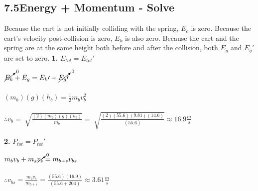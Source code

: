 \subsection*{7.5\hspace*{0.5cm}Energy + Momentum - Solve}
Because the cart is not initially colliding with the spring, $E_{e}$ is zero. Because the cart's velocity post-collision is zero, $E_{k}$ is also zero. Because the cart and the spring are at the same height both before and after the collision, both $E_{g}$ and $E_{g}\prime$ are set to zero.\newline\newline
\textbf{1.} $E_{tot} = E_{tot}\prime$ \\
\begin{adjustwidth}{0.6cm}{0pt}
    $\cancelto{0}{E_{k}} + E_{g} = E_{k}\prime + \cancelto{0}{E_{g}\prime}$ \\\\
    $(m_{b})(g)(h_{b}) = \frac{1}{2}m_{b}v_{b}^2$ \\\\
    $\therefore v_{b} = \sqrt[]{\frac{(2)(m_{b})(g)(h_{b})}{m_{b}}} = \sqrt[]{\frac{(2)(55.6)(9.81)(14.6)}{(55.6)}} \approx 16.9\frac{m}{s}$
\end{adjustwidth}\vspace*{15pt}
\textbf{2.} $P_{tot} = P_{tot}\prime$ \\
\begin{adjustwidth}{0.6cm}{0pt}
    $m_{b}v_{b} + m_{s}\cancelto{0}{v_{s}} = m_{b + s}v_{bs}$ \\\\
    $\therefore v_{bs} = \frac{m_{b}v_{b}}{m_{b + s}} = \frac{(55.6)(16.9)}{(55.6 + 204)} \approx 3.61\frac{m}{s}$
\end{adjustwidth}\vspace*{15pt}